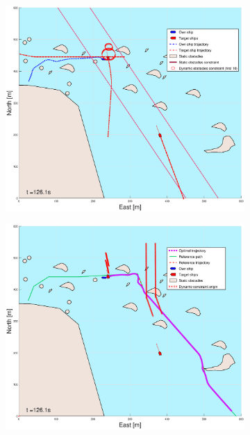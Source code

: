 \begin{figure}[ht]
\begin{subfigure}[b]{0.499\textwidth}
    \end{subfigure}
    \hfill
    \\
    \begin{subfigure}[b]{0.49\textwidth}
        \centering
        \includegraphics[width=\textwidth]{Images/Figures/skjergard_m_trafikk_NEW/_Simple_0fig1_time=126}
    \end{subfigure}
    \hfill
    \begin{subfigure}[b]{0.499\textwidth}
        \centering
        \includegraphics[width=\textwidth]{Images/Figures/skjergard_m_trafikk_NEW/_Simple_0fig999_time=126}

\end{subfigure}
\end{figure}
